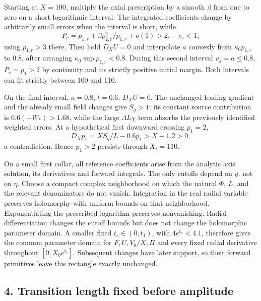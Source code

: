 \documentclass[10pt,a4paper]{article}
\begin{document}
Starting at \(X=100\), multiply the axial prescription by a smooth \(\beta\) from one to zero on a short logarithmic interval. The integrated coefficients change by arbitrarily small errors when the interval is short, while
\[
P_c=p_{1,r}+\beta p_{2,r}^2/p_{1,r}+o(1)>2,
\quad v_s<1,
\]
using \(p_{1,r}>3\) there. Then hold \(D_XU=0\) and interpolate \(a\) convexly from \(\kappa_0p_{1,r}\) to 0.8, after arranging \(\kappa_0\sup p_{1,r}<0.8\). During this second interval \(v_s=a\le0.8\), \(P_c=p_1>2\) by continuity and its strictly positive initial margin. Both intervals can fit strictly between 100 and 110.

On the final interval, \(a=0.8\), \(l=0.6\), \(D_XU=0\). The unchanged leading gradient and the already small field changes give \(S_q>1\): its constant source contribution is \(0.6(-W_*)>1.68\), while the large \(\Lambda L\chi\) term absorbs the previously identified weighted errors. At a hypothetical first downward crossing \(p_1=2\),
\[
D_Xp_1=XS_q/L-0.6p_1>X-1.2>0,
\]
a contradiction. Hence \(p_1>2\) persists through \(X_i=110\).

On a small first collar, all reference coefficients arise from the analytic axis solution, its derivatives and forward integrals. The only cutoffs depend on \(y\), not on \(\eta\). Choose a compact complex neighborhood on which the natural \(\Phi\), \(L\), and the relevant denominators do not vanish. Integration in the real radial variable preserves holomorphy with uniform bounds on that neighborhood. Exponentiating the prescribed logarithm preserves nonvanishing. Radial differentiation changes the cutoff bounds but does not change the holomorphic parameter domain. A smaller fixed \(t_c\in(0,t_1)\), with \(4e^{t_c}<4.1\), therefore gives the common parameter domain for \(F,U,V_0/X,\Pi\) and every fixed radial derivative throughout \([0,X_0e^{t_c}]\). Subsequent changes have later support, so their forward primitives leave this rectangle exactly unchanged.

\subsection{4. Transition length fixed before amplitude}
\end{document}
